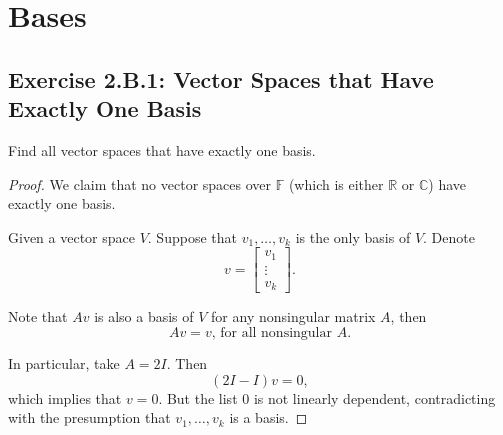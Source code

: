 \chapter{Bases}
\section{Exercise 2.B.1: Vector Spaces that Have Exactly One Basis}
Find all vector spaces that have exactly one basis.
\begin{proof}
We claim that no vector spaces over $\mathbb{F}$ (which is either $\mathbb{R}$ or $\mathbb{C}$) have exactly one basis.

Given a vector space $V$. Suppose that $v_1,\dots,v_k$ is the only basis of $V$. Denote \[
v=\begin{bmatrix}
v_1\\
\vdots\\
v_k\end{bmatrix}.\]

Note that $Av$ is also a basis of $V$ for any nonsingular matrix $A$, then\[
Av=v\text{, for all nonsingular }A.
\]

In particular, take $A=2I$. Then\[
(2I-I)v=0,
\] which implies that $v=0$. But the list $0$ is not linearly dependent, contradicting with the presumption that $v_1,\dots,v_k$ is a basis.
\end{proof}

